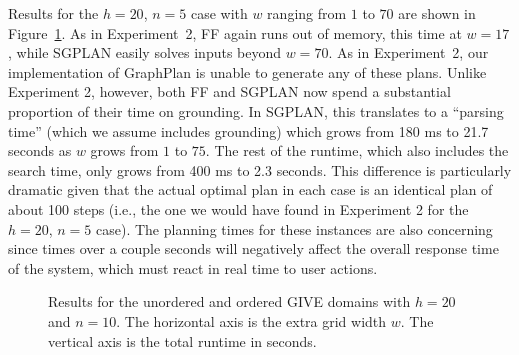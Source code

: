 Results for the $h=20$, $n=5$ case with $w$ ranging from $1$ to $70$ are
shown in Figure~\ref{fig:give-extracells}. As in Experiment~2, FF again
runs out of memory, this time at $w=17$, while SGPLAN easily solves inputs
beyond $w=70$. As in Experiment~2, our implementation of GraphPlan is
unable to generate any of these plans. Unlike Experiment 2, however, both
FF and SGPLAN now spend a substantial proportion of their time on
grounding. In SGPLAN, this translates to a ``parsing time'' (which we
assume includes grounding) which grows from 180 ms to 21.7 seconds as $w$
grows from $1$ to $75$. The rest of the runtime, which also includes the
search time, only grows from 400 ms to 2.3 seconds. This difference is
particularly dramatic given that the actual optimal plan in each case is an
identical plan of about 100 steps (i.e., the one we would have found in
Experiment 2 for the $h=20$, $n=5$ case). The planning times for these
instances are also concerning since times over a couple seconds will
negatively affect the overall response time of the system, which must react
in real time to user actions.


\begin{figure}[t]
  \caption{Results for the unordered and ordered GIVE domains with $h = 20$ and
  $n = 10$. The horizontal axis is the extra grid width $w$.
  The vertical axis is the total runtime in seconds.}
  \label{fig:give-extracells}
\end{figure}


